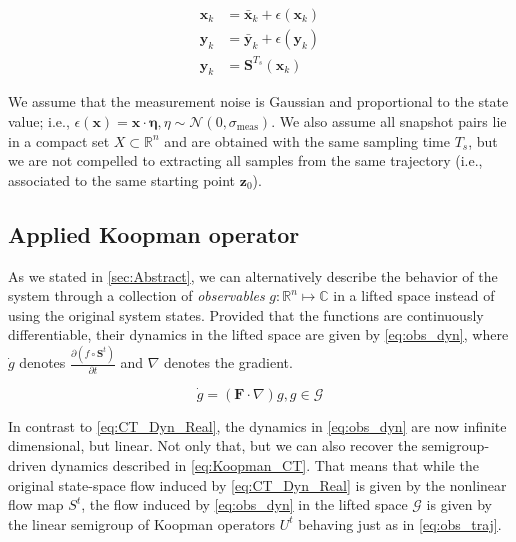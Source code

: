\documentclass{article}
\begin{document}
        \begin{align}
            \mathbf{x}_k &= \bar{\mathbf{x}}_k + \epsilon\left(\mathbf{x}_k\right) \label{eq:x_noisy} \\
            \mathbf{y}_k &= \bar{\mathbf{y}}_k + \epsilon\left(\mathbf{y}_k\right) \label{eq:y_noisy} \\
            \mathbf{y}_k &= \mathbf{S}^{T_s}\left(\mathbf{x}_k\right) \label{eq:snap}
        \end{align}

        We assume that the measurement noise is Gaussian and proportional to the state value; i.e., $\epsilon\left(\mathbf{x}\right) = \mathbf{x} \cdot \mathbf{\eta} , \eta \sim \mathcal{N}\left(0,\sigma_\text{meas}\right)$. We also assume all snapshot pairs lie in a compact set $X \subset \mathbb{R}^n$ and are obtained with the same sampling time $T_s$, but we are not compelled to extracting all samples from the same trajectory (i.e., associated to the same starting point $\mathbf{z}_0$).
    
    \subsection{Applied Koopman operator}

        As we stated in \cref{sec:Abstract}, we can alternatively describe the behavior of the system  through a collection of \textit{observables} $g : \mathbb{R}^n \mapsto \mathbb{C}$ in a lifted space instead of using the original system states. Provided that the functions are continuously differentiable, their dynamics in the lifted space are given by \cref{eq:obs_dyn}, where $\dot{g}$ denotes $\frac{\partial \left(f \circ \mathbf{S}^t\right)}{\partial t}$ and $\nabla$ denotes the gradient.

        \begin{equation} \label{eq:obs_dyn}
            \dot{g} = \left(\mathbf{F} \cdot \nabla\right) g , g \in \mathcal{G}
        \end{equation}

        In contrast to \cref{eq:CT_Dyn_Real}, the dynamics in \cref{eq:obs_dyn} are now infinite dimensional, but linear. Not only that, but we can also recover the semigroup-driven dynamics described in \cref{eq:Koopman_CT}. That means that while the original state-space flow induced by \cref{eq:CT_Dyn_Real} is given by the nonlinear flow map $S^t$, the flow induced by \cref{eq:obs_dyn} in the lifted space $\mathcal{G}$ is given by the linear semigroup of Koopman operators $U^t$ behaving just as in \cref{eq:obs_traj}.
        
\end{document}
